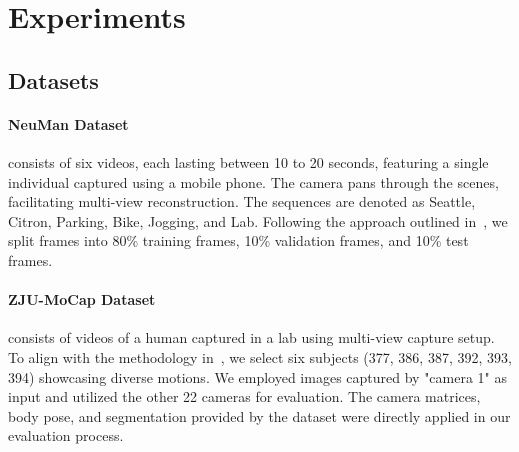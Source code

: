 


\section{Experiments}
\subsection{Datasets}

\paragraph{NeuMan Dataset~\cite{jiang2022neuman}} consists of six videos, each lasting between 10 to 20 seconds, featuring a single individual captured using a mobile phone. The camera pans through the scenes, facilitating multi-view reconstruction. The sequences are denoted as Seattle, Citron, Parking, Bike, Jogging, and Lab. Following the approach outlined in~\cite{jiang2022neuman}, we split frames into 80\% training frames, 10\% validation frames, and 10\% test frames.

\paragraph{ZJU-MoCap Dataset~\cite{peng2021neuralbody}} consists of videos of a human captured in a lab using multi-view capture setup. To align with the methodology in~\cite{weng2022humannerf,yu2023monohuman}, we select six subjects (377, 386, 387, 392, 393, 394) showcasing diverse motions. We employed images captured by "camera 1" as input and utilized the other 22 cameras for evaluation. The camera matrices, body pose, and segmentation provided by the dataset were directly applied in our evaluation process.

